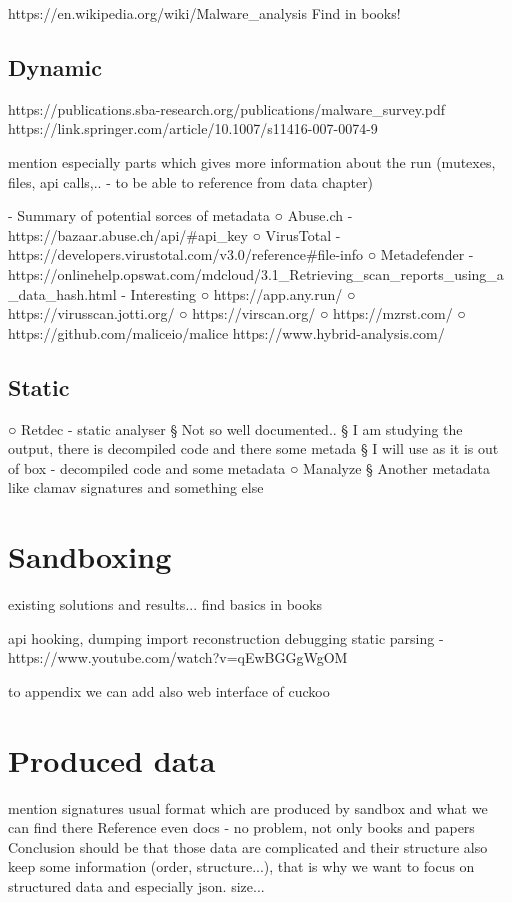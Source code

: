 https://en.wikipedia.org/wiki/Malware_analysis
Find in books!

\subsection{Dynamic}
https://publications.sba-research.org/publications/malware_survey.pdf
https://link.springer.com/article/10.1007/s11416-007-0074-9

mention especially parts which gives more information about the run (mutexes, files, api calls,.. - to be able to reference from data chapter)

- Summary of potential sorces of metadata
○ Abuse.ch - https://bazaar.abuse.ch/api/#api_key
○ VirusTotal - https://developers.virustotal.com/v3.0/reference#file-info
○ Metadefender - https://onlinehelp.opswat.com/mdcloud/3.1_Retrieving_scan_reports_using_a_data_hash.html
- Interesting
○ https://app.any.run/
○ https://virusscan.jotti.org/
○ https://virscan.org/
○ https://mzrst.com/
○ https://github.com/maliceio/malice
https://www.hybrid-analysis.com/

\subsection{Static}
○ Retdec - static analyser
§ Not so well documented..
§ I am studying the output, there is decompiled code and there some metada
§ I will use as it is out of box - decompiled code and some metadata
○ Manalyze
§ Another metadata like clamav signatures and something else


\section{Sandboxing}
existing solutions and results...
find basics in books

api hooking, dumping import reconstruction debugging static parsing - https://www.youtube.com/watch?v=qEwBGGgWgOM

to appendix we can add also web interface of cuckoo


\section{Produced data}
mention signatures
usual format which are produced by sandbox and what we can find there
Reference even docs - no problem, not only books and papers
Conclusion should be that those data are complicated and their structure also keep some information (order, structure...), that is why we want to focus on structured data and especially json.
size...

